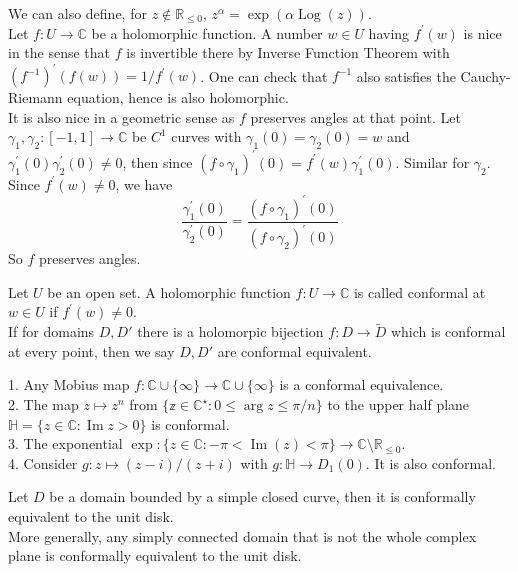 We can also define, for $z\notin \mathbb R_{\le 0}$, $z^\alpha=\exp(\alpha\operatorname{Log}(z))$.\\
Let $f:U\to\mathbb C$ be a holomorphic function.
A number $w\in U$ having $f^\prime(w)$ is nice in the sense that $f$ is invertible there by Inverse Function Theorem with $(f^{-1})^\prime(f(w))=1/f^\prime(w)$.
One can check that $f^{-1}$ also satisfies the Cauchy-Riemann equation, hence is also holomorphic.\\
It is also nice in a geometric sense as $f$ preserves angles at that point.
Let $\gamma_1,\gamma_2:[-1,1]\to\mathbb C$ be $C^1$ curves with $\gamma_1(0)=\gamma_2(0)=w$ and $\gamma_1^\prime(0)\gamma_2^\prime(0)\neq 0$, then since $(f\circ \gamma_1)^\prime(0)=f^\prime(w)\gamma^\prime_1(0)$.
Similar for $\gamma_2$.
Since $f^\prime(w)\neq 0$, we have
$$\frac{\gamma^\prime_1(0)}{\gamma_2^\prime(0)}=\frac{(f\circ\gamma_1)^\prime(0)}{(f\circ\gamma_2)^\prime(0)}$$
So $f$ preserves angles.
\begin{definition}
    Let $U$ be an open set.
    A holomorphic function $f:U\to\mathbb C$ is called conformal at $w\in U$ if $f^\prime(w)\neq 0$.\\
    If for domains $D,D'$ there is a holomorpic bijection $f:D\to\tilde{D}$ which is conformal at every point, then we say $D,D'$ are conformal equivalent.
\end{definition}
\begin{example}
    1. Any Mobius map $f:\mathbb C\cup\{\infty\}\to\mathbb C\cup\{\infty\}$ is a conformal equivalence.\\
    2. The map $z\mapsto z^n$ from $\{\mathbb z\in\mathbb C^\star:0\le\arg z\le \pi/n\}$ to the upper half plane $\mathbb H=\{z\in\mathbb C:\operatorname{Im}z>0\}$ is conformal.\\
    3. The exponential $\exp:\{z\in\mathbb C:-\pi<\operatorname{Im}(z)<\pi\}\to\mathbb C\setminus\mathbb R_{\le 0}$.\\
    4. Consider $g:z\mapsto (z-i)/(z+i)$ with $g:\mathbb H\to D_1(0)$.
    It is also conformal.
\end{example}
\begin{theorem}
    Let $D$ be a domain bounded by a simple closed curve, then it is conformally equivalent to the unit disk.\\
    More generally, any simply connected domain that is not the whole complex plane is conformally equivalent to the unit disk.
\end{theorem}
